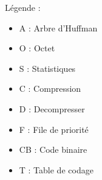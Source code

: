 Légende :
\begin{itemize}
    \item A : Arbre d'Huffman
    \item O : Octet
    \item S : Statistiques
    \item C : Compression
    \item D : Decompresser
    \item F : File de priorité
    \item CB : Code binaire
    \item T : Table de codage
\end{itemize}